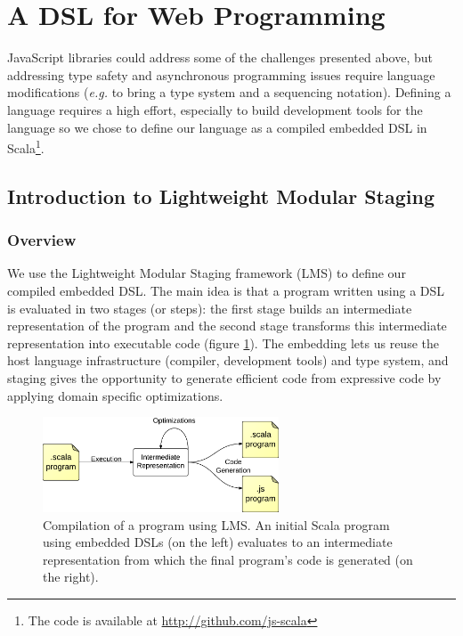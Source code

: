 \documentclass[american,english,runningheads]{llncs}
\newcommand{\eg}{\emph{e.g.}}
\begin{document}
\section{A DSL for Web Programming}
\label{solution}

JavaScript libraries could address some of the challenges presented above, but addressing type safety and
asynchronous programming issues require language modifications (\eg{} to bring a type system and a sequencing
notation). Defining a language requires a high effort, especially to build development tools for the language so we
chose to define our language as a compiled embedded DSL in Scala\footnote{The code is available at
\href{http://github.com/js-scala}{http://github.com/js-scala}}.

\subsection{Introduction to Lightweight Modular Staging}
\label{intro-lms}

\subsubsection{Overview}

We use the Lightweight Modular Staging framework (LMS) to define our compiled embedded DSL. The main idea is that a
program written using a DSL is evaluated in two stages (or steps): the first stage builds an intermediate
representation of the program and the second stage transforms this intermediate representation into executable code
(figure \ref{lms-diagram}). The embedding lets us reuse the host language infrastructure (compiler, development
tools) and type system, and staging gives the opportunity to generate efficient code from expressive code by applying
domain specific optimizations.

\begin{figure}
  \centering
  \includegraphics[width=7cm]{lms.pdf}
  \caption{Compilation of a program using LMS. An initial Scala program using embedded DSLs (on the left) evaluates
  to an intermediate representation from which the final program’s code is generated (on the right).}
  \label{lms-diagram}
\end{figure}
\end{document}

